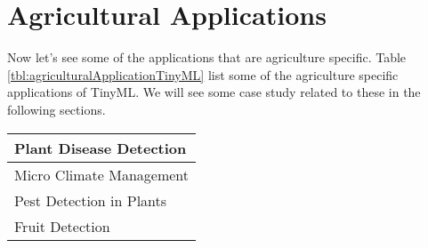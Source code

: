 \documentclass[../../main]{subfiles}
\begin{document}
\section{Agricultural Applications} \label{sec:}

Now let's see some of the applications that are agriculture specific.
Table \ref{tbl:agriculturalApplicationTinyML} list some of the agriculture
specific applications of TinyML. We will see some case study related to
these in the following sections.

\begin{center}

    \renewcommand\arraystretch{1.75}

    \begin{tabularx} {\textwidth} {
            >{\centering\arraybackslash}X
        }

        \toprule
        \midrule

        Plant Disease Detection \\ \midrule
        Micro Climate Management \\ \midrule
        Pest Detection in Plants \\ \midrule
        Fruit Detection \\

        \midrule
        \bottomrule

    \end{tabularx}

    \label{tbl:agriculturalApplicationTinyML}

\end{center}
\end{document}
